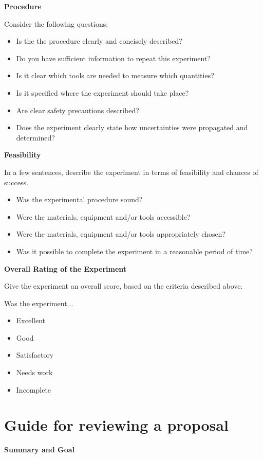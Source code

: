 \textbf{Procedure}

Consider the following questions:
\begin{itemize}
\item Is the the procedure clearly and concisely described? 
\item Do you have sufficient information to repeat this experiment?
\item Is it clear which tools are needed to measure which quantities?
\item Is it specified where the experiment should take place?
\item Are clear safety precautions described?
\item Does the experiment clearly state how uncertainties were propagated and determined?
\end{itemize}

\textbf{Feasibility}

In a few sentences, describe the experiment in terms of feasibility and chances of success. 

\begin{itemize}
\item Was the experimental procedure sound?
\item Were the materials, equipment and/or tools accessible? 
\item Were the materials, equipment and/or tools appropriately chosen?
\item Was it possible to complete the experiment in a reasonable period of time?
\end{itemize}


\textbf{Overall Rating of the Experiment}

Give the experiment an overall score, based on the criteria described above.

Was the experiment...
\begin{itemize}
\item Excellent
\item Good
\item Satisfactory
\item Needs work
\item Incomplete
\end{itemize}

\newpage
\section{Guide for reviewing a proposal}
 \vspace{0.25cm}
\textbf{Summary and Goal}

